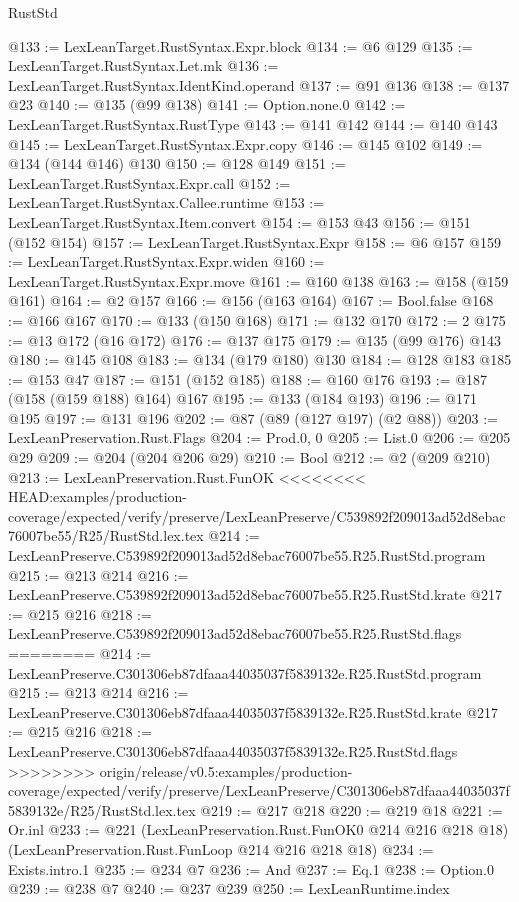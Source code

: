 \begin{lexlean}{RustStd}
\begin{coremodule}
{\begin{coremodule}
{{{{{@133 := LexLeanTarget.RustSyntax.Expr.block
@134 := @6 @129
@135 := LexLeanTarget.RustSyntax.Let.mk
@136 := LexLeanTarget.RustSyntax.IdentKind.operand
@137 := @91 @136
@138 := @137 @23
@140 := @135 (@99 @138)
@141 := Option.none.{0}
@142 := LexLeanTarget.RustSyntax.RustType
@143 := @141 @142
@144 := @140 @143
@145 := LexLeanTarget.RustSyntax.Expr.copy
@146 := @145 @102
@149 := @134 (@144 @146) @130
@150 := @128 @149
@151 := LexLeanTarget.RustSyntax.Expr.call
@152 := LexLeanTarget.RustSyntax.Callee.runtime
@153 := LexLeanTarget.RustSyntax.Item.convert
@154 := @153 @43
@156 := @151 (@152 @154)
@157 := LexLeanTarget.RustSyntax.Expr
@158 := @6 @157
@159 := LexLeanTarget.RustSyntax.Expr.widen
@160 := LexLeanTarget.RustSyntax.Expr.move
@161 := @160 @138
@163 := @158 (@159 @161)
@164 := @2 @157
@166 := @156 (@163 @164)
@167 := Bool.false
@168 := @166 @167
@170 := @133 (@150 @168)
@171 := @132 @170
@172 := 2
@175 := @13 @172 (@16 @172)
@176 := @137 @175
@179 := @135 (@99 @176) @143
@180 := @145 @108
@183 := @134 (@179 @180) @130
@184 := @128 @183
@185 := @153 @47
@187 := @151 (@152 @185)
@188 := @160 @176
@193 := @187 (@158 (@159 @188) @164) @167
@195 := @133 (@184 @193)
@196 := @171 @195
@197 := @131 @196
@202 := @87 (@89 (@127 @197) (@2 @88))
@203 := LexLeanPreservation.Rust.Flags
@204 := Prod.{0, 0}
@205 := List.{0}
@206 := @205 @29
@209 := @204 (@204 @206 @29)
@210 := Bool
@212 := @2 (@209 @210)
@213 := LexLeanPreservation.Rust.FunOK
<<<<<<<< HEAD:examples/production-coverage/expected/verify/preserve/LexLeanPreserve/C539892f209013ad52d8ebac76007be55/R25/RustStd.lex.tex
@214 := LexLeanPreserve.C539892f209013ad52d8ebac76007be55.R25.RustStd.program
@215 := @213 @214
@216 := LexLeanPreserve.C539892f209013ad52d8ebac76007be55.R25.RustStd.krate
@217 := @215 @216
@218 := LexLeanPreserve.C539892f209013ad52d8ebac76007be55.R25.RustStd.flags
========
@214 := LexLeanPreserve.C301306eb87dfaaa44035037f5839132e.R25.RustStd.program
@215 := @213 @214
@216 := LexLeanPreserve.C301306eb87dfaaa44035037f5839132e.R25.RustStd.krate
@217 := @215 @216
@218 := LexLeanPreserve.C301306eb87dfaaa44035037f5839132e.R25.RustStd.flags
>>>>>>>> origin/release/v0.5:examples/production-coverage/expected/verify/preserve/LexLeanPreserve/C301306eb87dfaaa44035037f5839132e/R25/RustStd.lex.tex
@219 := @217 @218
@220 := @219 @18
@221 := Or.inl
@233 := @221
    (LexLeanPreservation.Rust.FunOK0 @214 @216 @218 @18)
    (LexLeanPreservation.Rust.FunLoop @214 @216 @218 @18)
@234 := Exists.intro.{1}
@235 := @234 @7
@236 := And
@237 := Eq.{1}
@238 := Option.{0}
@239 := @238 @7
@240 := @237 @239
@250 := LexLeanRuntime.index
}}}}}
\end{coremodule}}
\end{coremodule}
\end{lexlean}
